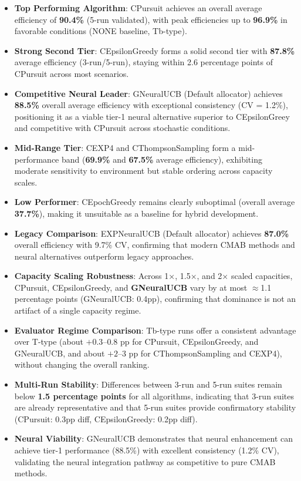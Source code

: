 \documentclass[12pt,a4paper]{article}
\newcommand{\performance}[1]{\textcolor{performancecolor}{\textbf{#1}}}
\newcommand{\critical}[1]{\textcolor{criticalcolor}{\textbf{#1}}}
\newcommand{\success}[1]{\textcolor{successcolor}{\textbf{#1}}}
\newcommand{\legacy}[1]{\textcolor{legacycolor}{\textbf{#1}}}
\newcommand{\neural}[1]{\textcolor{neuralcolor}{\textbf{#1}}}
\begin{document}
\begin{tcolorbox}[colback=highlightcolor!30,colframe=performancecolor,title=\textbf{Key Experimental Results Summary (3-run/5-run, 1$\times$–2$\times$ Capacities, T/Tb Regimes)}]
\begin{itemize}
\item \performance{Top Performing Algorithm}: CPursuit achieves an overall average efficiency of \textbf{90.4\%} (5-run validated), with peak efficiencies up to \textbf{96.9\%} in favorable conditions (NONE baseline, Tb-type).
\item \performance{Strong Second Tier}: CEpsilonGreedy forms a solid second tier with \textbf{87.8\%} average efficiency (3-run/5-run), staying within 2.6 percentage points of CPursuit across most scenarios.
\item \neural{Competitive Neural Leader}: GNeuralUCB (Default allocator) achieves \textbf{88.5\%} overall average efficiency with exceptional consistency (CV = 1.2\%), positioning it as a viable tier-1 neural alternative superior to CEpsilonGreey and competitive with CPursuit across stochastic conditions.
\item \performance{Mid-Range Tier}: CEXP4 and CThompsonSampling form a mid-performance band (\textbf{69.9\%} and \textbf{67.5\%} average efficiency), exhibiting moderate sensitivity to environment but stable ordering across capacity scales.
\item \critical{Low Performer}: CEpochGreedy remains clearly suboptimal (overall average \textbf{37.7\%}), making it unsuitable as a baseline for hybrid development.
\item \legacy{Legacy Comparison}: EXPNeuralUCB (Default allocator) achieves \textbf{87.0\%} overall efficiency with 9.7\% CV, confirming that modern CMAB methods and neural alternatives outperform legacy approaches.
\item \success{Capacity Scaling Robustness}: Across 1$\times$, 1.5$\times$, and 2$\times$ scaled capacities, CPursuit, CEpsilonGreedy, and \neural{GNeuralUCB} vary by at most $\approx$1.1 percentage points (GNeuralUCB: 0.4pp), confirming that dominance is not an artifact of a single capacity regime.
\item \success{Evaluator Regime Comparison}: Tb-type runs offer a consistent advantage over T-type (about $+0.3$--$0.8$ pp for CPursuit, CEpsilonGreedy, and GNeuralUCB, and about $+2$--$3$ pp for CThompsonSampling and CEXP4), without changing the overall ranking.
\item \success{Multi-Run Stability}: Differences between 3-run and 5-run suites remain below \textbf{1.5 percentage points} for all algorithms, indicating that 3-run suites are already representative and that 5-run suites provide confirmatory stability (CPursuit: 0.3pp diff, CEpsilonGreedy: 0.2pp diff).
\item \neural{Neural Viability}: GNeuralUCB demonstrates that neural enhancement can achieve tier-1 performance (88.5\%) with excellent consistency (1.2\% CV), validating the neural integration pathway as competitive to pure CMAB methods.
\end{itemize}
\end{tcolorbox}
\end{document}
